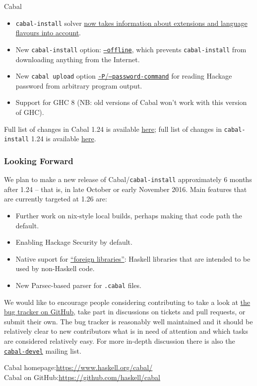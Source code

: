 \documentclass[DIV16,twocolumn,10pt]{scrreprt}
\begin{document}
\begin{hcarentry}{Cabal}
\begin{itemize}
\item \texttt{cabal-install} solver
  \href{https://github.com/haskell/cabal/pull/2873}{now takes information about
    extensions and language flavours into account}.
\item New \texttt{cabal-install} option:
  \href{https://github.com/haskell/cabal/pull/2578}{\texttt{--offline}}, which
  prevents \texttt{cabal-install} from downloading anything from the Internet.
\item New \texttt{cabal upload} option
  \href{https://github.com/haskell/cabal/pull/2506}{\texttt{-P}/\texttt{--password-command}}
  for reading Hackage password from arbitrary program output.
\item Support for GHC 8 (NB: old versions of Cabal won't work with this version
  of GHC).
\end{itemize}

Full list of changes in Cabal 1.24 is available
\href{http://hackage.haskell.org/package/Cabal-1.24.0.0/changelog}{here}; full
list of changes in \texttt{cabal-install} 1.24 is available
\href{http://hackage.haskell.org/package/cabal-install-1.24.0.0/changelog}{here}.

\subsubsection*{Looking Forward}

We plan to make a new release of Cabal/\texttt{cabal-install} approximately 6
months after 1.24 -- that is, in late October or early November 2016. Main
features that are currently targeted at 1.26 are:

\begin{itemize}
\item Further work on nix-style local builds, perhaps making that code path the
  default.
\item Enabling Hackage Security by default.
\item Native suport for
  \href{https://github.com/haskell/cabal/pull/2540}{``foreign libraries''}:
  Haskell libraries that are intended to be used by non-Haskell code.
\item New Parsec-based parser for \texttt{.cabal} files.
\end{itemize}

We would like to encourage people considering contributing to take a look at
\href{https://github.com/haskell/cabal/issues/}{the bug tracker on GitHub}, take
part in discussions on tickets and pull requests, or submit their own. The bug
tracker is reasonably well maintained and it should be relatively clear to new
contributors what is in need of attention and which tasks are considered
relatively easy. For more in-depth discussion there is also the
\href{https://mail.haskell.org/mailman/listinfo/cabal-devel}{\texttt{cabal-devel}}
mailing list.

\FurtherReading
  Cabal homepage:\hfill\url{https://www.haskell.org/cabal/}\\
  Cabal on GitHub:\hfill\url{https://github.com/haskell/cabal}

\end{hcarentry}
\end{document}
